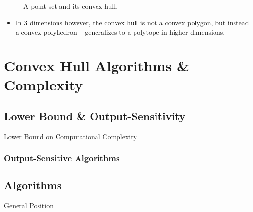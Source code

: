 \documentclass{beamer}
\begin{document}
\begin{frame}[t]
\begin{figure}
\begin{subfigure}{0.35\textwidth}
      \end{subfigure}
      \caption{A point set and its convex hull.}
    \end{figure}
    \begin{itemize}
    \item In 3 dimensions however, the convex hull is not a convex polygon, but instead a 
    convex polyhedron -- generalizes to a polytope in higher dimensions.
  \end{itemize}
\end{frame}


    
    \section{Convex Hull Algorithms \& Complexity}
    \subsection{Lower Bound \& Output-Sensitivity}
    \begin{frame}{Lower Bound on Computational Complexity}
          
    \end{frame}

    \begin{frame}
      \frametitle{Output-Sensitive Algorithms}
    \end{frame}

    \subsection{Algorithms}
    \begin{frame}{General Position}
      
    \end{frame}
\end{document}
